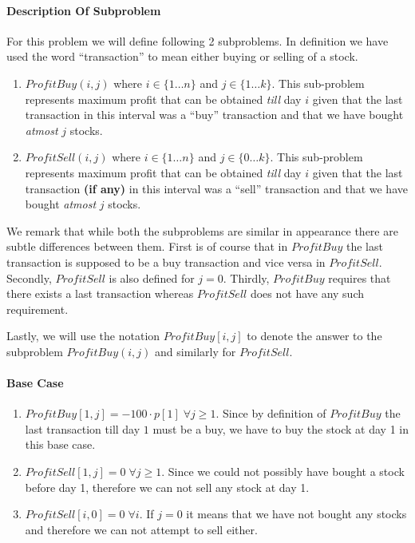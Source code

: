 \documentclass[answers]{exam}
\begin{document}
\begin{questions}
\begin{solution}
\paragraph{Description Of Subproblem}
For this problem we will define following 2 subproblems. In definition we have used the word ``transaction'' to mean either buying or selling of a stock.
\begin{enumerate}
    \item $ProfitBuy(i, j)$ where $i \in \{1 \ldots n\}$ and $j \in \{1 \ldots k\}$. This sub-problem represents maximum profit that can be obtained \emph{till} day $i$ given that the last transaction in this interval was a ``buy'' transaction and that we have bought \emph{atmost} $j$ stocks.
    \item $ProfitSell(i, j)$ where $i \in \{1 \ldots n\}$ and $j \in \{0 \ldots k\}$. This sub-problem represents maximum profit that can be obtained \emph{till} day $i$ given that the last transaction \textbf{(if any)} in this interval was a ``sell'' transaction and that we have bought \emph{atmost} $j$ stocks.
\end{enumerate}
We remark that while both the subproblems are similar in appearance there are subtle differences between them. First is of course that in $ProfitBuy$ the last transaction is supposed to be a buy transaction and vice versa in $ProfitSell$. Secondly, $ProfitSell$ is also defined for $j = 0$. Thirdly, $ProfitBuy$ requires that there exists a last transaction whereas $ProfitSell$ does not have any such requirement.

Lastly, we will use the notation $ProfitBuy[i,j]$ to denote the answer to the subproblem $ProfitBuy(i,j)$ and similarly for $ProfitSell$.

\paragraph{Base Case}
\begin{enumerate}
    \item $ProfitBuy[1, j] = -100 \cdot p[1] \; \forall j \geq 1$. Since by definition of $ProfitBuy$ the last transaction till day $1$ must be a buy, we have to buy the stock at day 1 in this base case.
    \item $ProfitSell[1, j] = 0 \; \forall j \geq 1$. Since we could not possibly have bought a stock before day 1, therefore we can not sell any stock at day 1.
    \item $ProfitSell[i, 0] = 0 \; \forall i$. If $j=0$ it means that we have not bought any stocks and therefore we can not attempt to sell either.
\end{enumerate}

\end{solution}
\end{questions}
\end{document}
